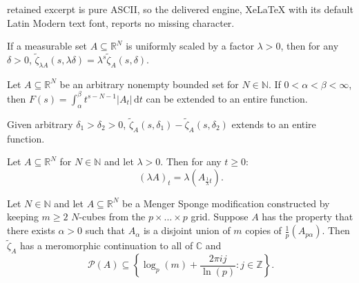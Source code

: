 \documentclass[10pt,a4paper]{amsart}
\begin{document}
retained excerpt is pure ASCII, so the delivered engine, XeLaTeX with its default Latin Modern text font, reports no missing character.
\begin{theorem} \label{thm:scaling}
If a measurable set $A \subseteq \mathbb{R}^N$ is uniformly scaled by a factor $\lambda > 0$, then for any $\delta > 0$, $\tilde{\zeta}_{\lambda A}(s, \lambda\delta) = \lambda^s \tilde{\zeta}_A(s, \delta)$.
\end{theorem}

\begin{theorem} \label{thm:entireextension}
Let $A \subseteq \mathbb{R}^N$ be an arbitrary nonempty bounded set for $N \in \mathbb{N}$. If $0 < \alpha < \beta < \infty$, then $\displaystyle F(s) = \int_{\alpha}^{\beta} t^{s-N-1} |A_t| \,\mathrm{d}t$ can be extended to an entire function.
\end{theorem}

\begin{corollary} \label{thm:anydelta}
Given arbitrary $\delta_1 > \delta_2 > 0$, $\tilde{\zeta}_A(s,\delta_1) - \tilde{\zeta}_A(s,\delta_2)$ extends to an entire function.
\end{corollary}

\begin{lemma} \label{thm:inflationlemma}
Let $A \subseteq \mathbb{R}^N$ for $N \in \mathbb{N}$ and let $\lambda > 0$. Then for any $t \geq 0$:
\begin{equation}
(\lambda A)_t = \lambda \left(A_{\frac{1}{\lambda} t}\right).
\end{equation}
\end{lemma}

\begin{theorem} \label{thm:alphaconnectedRN}
Let $N \in \mathbb{N}$ and let $A \subseteq \mathbb{R}^N$ be a Menger Sponge modification constructed by keeping $m \geq 2$ $N$-cubes from the $p \times\dots\times p$ grid. Suppose $A$ has the property that there exists $\alpha > 0$ such that $A_{\alpha}$ is a disjoint union of $m$ copies of $\frac{1}{p} \left(A_{p\alpha}\right)$. Then $\tilde{\zeta}_A$ has a meromorphic continuation to all of $\mathbb{C}$ and
\begin{equation}
\mathscr{P}(A) \subseteq \left\{\log_p(m) + \frac{2\pi i j}{\ln(p)}: j \in \mathbb{Z}\right\}.
\end{equation}
\end{theorem}
\end{document}

